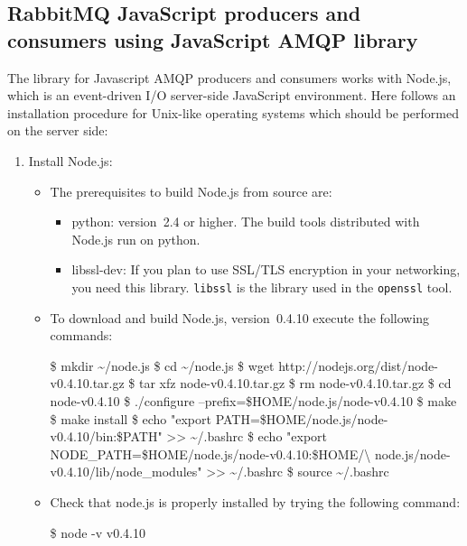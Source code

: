 \subsection{RabbitMQ JavaScript producers and consumers using
JavaScript AMQP library}
\label{javascript-node.js}

The library for Javascript AMQP producers and consumers works with
\textsf{Node.js}, which is an event-driven I/O server-side JavaScript
environment. Here follows an installation procedure for Unix-like
operating systems which should be performed on the server side:

\begin{enumerate}
\item Install \textsf{Node.js}:

\begin{itemize}
\item The prerequisites to build \textsf{Node.js} from source are:
\begin{itemize}
\item \textsf{python}: version~2.4 or higher. The build tools distributed with 
\textsf{Node.js} run on python.
\item \textsf{libssl-dev}: If you plan to use SSL/TLS encryption in
  your networking, you need this library. \texttt{libssl} is the
  library used in the \texttt{openssl} tool.
\end{itemize}
\item To download and build \textsf{Node.js}, version~0.4.10 execute the 
following commands:

\begin{shellcmd}
\$ mkdir \textasciitilde/node.js
\$ cd 	\textasciitilde/node.js
\$ wget http://nodejs.org/dist/node-v0.4.10.tar.gz
\$ tar xfz node-v0.4.10.tar.gz
\$ rm node-v0.4.10.tar.gz
\$ cd node-v0.4.10
\$ ./configure --prefix=\$HOME/node.js/node-v0.4.10
\$ make
\$ make install
\$ echo "export PATH=\$HOME/node.js/node-v0.4.10/bin:\$PATH" >> \textasciitilde/.bashrc
\$ echo "export NODE_PATH=\$HOME/node.js/node-v0.4.10:\$HOME/\textbackslash
  node.js/node-v0.4.10/lib/node_modules" >> \textasciitilde/.bashrc
\$ source \textasciitilde/.bashrc
\end{shellcmd}
\item Check that \textsf{node.js} is properly installed by trying the following
command:
\begin{shellcmd}
\$ node -v
v0.4.10
\end{shellcmd}
\end{itemize}


\end{enumerate}
